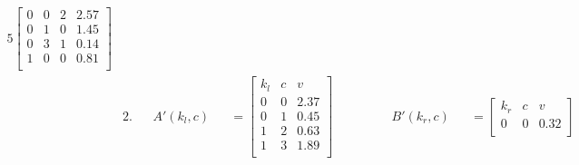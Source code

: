 \begin{figure}[H]
\begin{alignat*}{5}
\begin{bmatrix}
                                                               0 & 0 & 2   & 2.57 \\
                                                               0 & 1 & 0   & 1.45 \\
                                                               0 & 3 & 1   & 0.14 \\
                                                               1 & 0 & 0   & 0.81 \\
                                                           \end{bmatrix}
        \\
         & 2.          &              & A'(k_l, c)     &                                                                                      & = \begin{bmatrix}
                                                                                                                                                      k_l & c & v    \\
                                                                                                                                                      0   & 0 & 2.37 \\
                                                                                                                                                      0   & 1 & 0.45 \\
                                                                                                                                                      1   & 2 & 0.63 \\
                                                                                                                                                      1   & 3 & 1.89 \\
                                                                                                                                                  \end{bmatrix}
         &             & \qquad \quad B'(k_r, c)   &                & = \begin{bmatrix}
                                                               k_r & c & v    \\
                                                               0   & 0 & 0.32 \\

\end{bmatrix}
\end{alignat*}
\end{figure}
